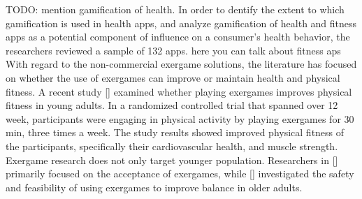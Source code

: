 TODO: mention gamification of health. In order to dentify the extent to which gamification is used in health apps, and analyze gamification of health and fitness apps as a potential component of influence on a consumer’s health behavior, the researchers  reviewed a sample of 132 apps. %
here you can talk about fitness aps\\
With regard to the non-commercial exergame solutions, the literature has focused on whether the
use of exergames can improve or maintain health and physical fitness. A recent study [] examined whether playing exergames improves physical fitness in young adults. In a randomized controlled trial that spanned over 12 week, participants were engaging in physical activity by playing exergames for 30 min, three times a week. The study results showed improved physical fitness of the participants, specifically their
cardiovascular health, and muscle strength. Exergame research does not only target younger population. Researchers in [] primarily focused on the acceptance of exergames, while [] investigated the safety and feasibility of using exergames to improve balance in older adults.












